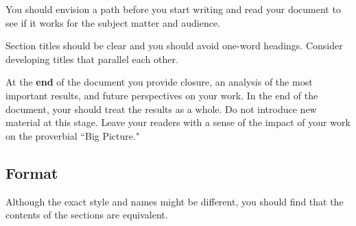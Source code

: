 You should envision a path before you start writing and read your document to see if it works for the subject matter and audience. 

Section titles should be clear and you should avoid one-word headings. Consider developing titles that parallel each other.


At the \textbf{end} of the document you provide closure, an analysis of the most important results, and future perspectives on your work. In the end of the document, your should treat the results as a whole. Do not introduce new material at this stage. Leave your readers with a sense of the impact of your work on the proverbial ``Big Picture."


\subsection{Format}

Although the exact style and names might be different, you should find that the contents of the sections are equivalent. 

